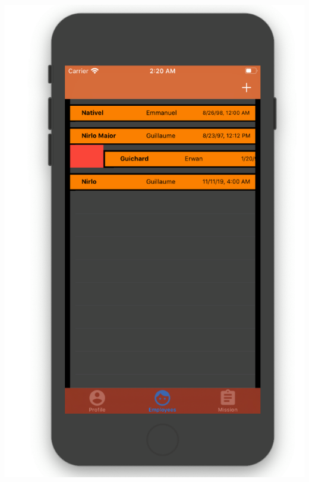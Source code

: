 \documentclass{article}
\begin{document}
\begin{center}
	\includegraphics[scale=0.15]{listeEIOS.png}

\end{center}
\end{document}
